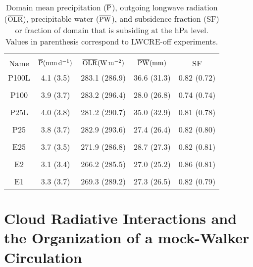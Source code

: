 \documentclass[draft]{agujournal2019}
\begin{document}
\begin{table}
\begin{center}
\caption{Domain mean precipitation ($\overline{\rm{P}}$), outgoing longwave radiation 
($\overline{\rm{OLR}}$), precipitable water ($\overline{\rm{PW}}$), and subsidence fraction (SF)  
or fraction of domain that is subsiding at the  hPa level.
Values in parenthesis correspond to LWCRE-off experiments.}
    \begin{tabular}{*{5}{c}}
    \hline
    \hline
    \\
 Name &   $\overline{\rm{P}} (\mathrm{mm \,d^{-1}})$ & $\overline{\rm{OLR}} (\rm{W \, m^{-2}})$ & $\overline{\rm{PW}} (\rm{mm})$ & SF   \\ \hline
  P100L   &  4.1 (3.5)   &  283.1 (286.9)  & 36.6 (31.3)  & 0.82 (0.72)      \\ 
    \\
  P100 &   3.9 (3.7)   &  283.2 (296.4)  & 28.0 (26.8) & 0.74 (0.74)           \\  
    \\
  P25L &   4.0 (3.8)  &  281.2 (290.7)   & 35.0 (32.9) & 0.81 (0.78)          \\  
    \\
  P25  &   3.8 (3.7)    & 282.9 (293.6)   & 27.4 (26.4) & 0.82 (0.80)          \\  
    \\
 E25  & 3.7 (3.5)    &   271.9 (286.8)   & 28.7 (27.3) & 0.82 (0.81)            \\  
    \\
 E2   &  3.1 (3.4)   &  266.2 (285.5)    & 27.0 (25.2) & 0.86 (0.81)           \\ 
    \\
 E1   &  3.3 (3.7)   &  269.3 (289.2)    & 27.3 (26.5) & 0.82 (0.79)         \\  \hline

    \end{tabular}\par
    \label{tab:experimentmeans}
\end{center}
\end{table}



\section{Cloud Radiative Interactions and the Organization of a mock-Walker Circulation}
\end{document}
